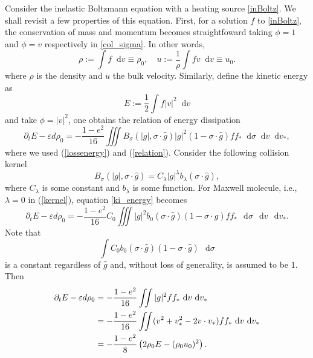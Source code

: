 \documentclass[review, times]{elsarticle}
\newcommand*\diff{\mathop{}\!\mathrm{d}}
\begin{document}
Consider the inelastic Boltzmann equation with a heating source \eqref{inBoltz}. We shall revisit a few properties of this equation. First, for a solution $f$ to \eqref{inBoltz}, the conservation of mass and momentum becomes straightfoward taking $\phi = 1$ and $\phi = v$ respectively in \eqref{col_sigma}. In other words,
\begin{equation}
\rho := \int f\diff{v}\equiv \rho_0, \quad  u :=\frac{1}{\rho}\int fv \diff{v}\equiv u_0.
\end{equation}
where $\rho$ is the density and $u$ the bulk velocity. Similarly, define the kinetic energy as
\begin{equation}
  E := \frac{1}{2}\int f |v|^2\diff v
\end{equation}
and take $\phi = |v|^2$, one obtains the relation of energy dissipation
\begin{equation}\label{ki_energy}
\partial_t E -\varepsilon d\rho_0=-\frac{1-e^2}{16}\iiint B_{\sigma}(|g|,\sigma\cdot \hat{g})|g|^2(1-\sigma\cdot \hat{g})ff_*\diff{\sigma}\diff{v}\diff{v_*},
\end{equation}
where we used (\ref{lossenergy}) and (\ref{relation}). Consider the following collision kernel
\begin{equation} \label{kernel}
B_{\sigma}(|g|,\sigma\cdot \hat{g})=C_{\lambda}|g|^{\lambda}b_{\lambda}(\sigma\cdot \hat{g}),
\end{equation}
where $C_{\lambda}$ is some constant and $b_{\lambda}$ is some function. For Maxwell molecule, i.e., $\lambda=0$ in (\ref{kernel}), equation \eqref{ki_energy} becomes
\begin{equation} 
\partial_t E -\varepsilon d\rho_0=-\frac{1-e^2}{16}C_0\iiint |g|^{2}b_0(\sigma\cdot \hat{g})(1-\sigma\cdot \hat{g})ff_*\,\diff{\sigma}\,\diff{v}\,\diff{v_*}.
\end{equation}
Note that
\begin{equation}
\int C_0b_0(\sigma\cdot \hat{g})(1-\sigma\cdot \hat{g})\,\diff{\sigma}
\end{equation}
is a constant regardless of $\hat{g}$ and, without loss of generality, is assumed to be $1$. Then
\begin{align} 
  \partial_t E -\varepsilon d\rho_0 &=-\frac{1-e^2}{16}\iint |g|^{2}ff_*\,\diff{v}\,\diff{v_*} \notag\\
   & =-\frac{1-e^2}{16}\iint (v^2+v_*^2-2v\cdot v_*)ff_*\,\diff{v}\,\diff{v_*} \notag \\
   &=-\frac{1-e^2}{8}\left(2\rho_0E - (\rho_0 u_0)^2\right).
\end{align}
\end{document}
